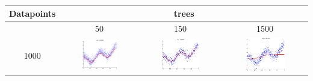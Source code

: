 \begin{landscape}

\begin{table}[p]
\begin{tabular}{|c|c|c|c|}
\toprule
Datapoints & \multicolumn{3}{|c|}{trees} \\ \hline
\midrule
& 50 & 150 & 1500 \\ \hline
1000 & \includegraphics[width=0.5\textwidth, height=0.35\textheight]{fig/cos_1k_50} & \includegraphics[width=0.5\textwidth, height=0.35\textheight]{fig/cos_1k_150} & \includegraphics[width=0.5\textwidth, height=0.35\textheight]{fig/cos_1k_1500} \\ \hline

\end{tabular}
\end{table}
\end{landscape}
